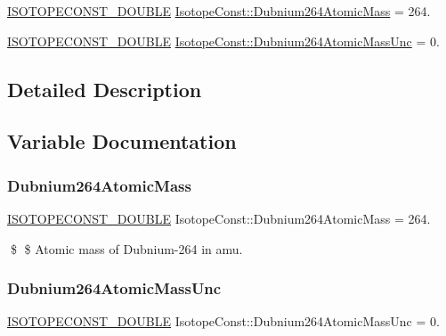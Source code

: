 \begin{DoxyCompactItemize}
\item 
\mbox{\hyperlink{group___isotope_const-_macros_ga8f45a7272ce02c0b4c65c44636ed719a}{I\+S\+O\+T\+O\+P\+E\+C\+O\+N\+S\+T\+\_\+\+D\+O\+U\+B\+LE}} \mbox{\hyperlink{group___isotope_const-_dubnium-_db264_ga01e6ef9266a7f32cda8d37e1257813d2}{Isotope\+Const\+::\+Dubnium264\+Atomic\+Mass}} = 264.
\item 
\mbox{\hyperlink{group___isotope_const-_macros_ga8f45a7272ce02c0b4c65c44636ed719a}{I\+S\+O\+T\+O\+P\+E\+C\+O\+N\+S\+T\+\_\+\+D\+O\+U\+B\+LE}} \mbox{\hyperlink{group___isotope_const-_dubnium-_db264_ga90d5c5fbae6656e55a7c35ac06a42100}{Isotope\+Const\+::\+Dubnium264\+Atomic\+Mass\+Unc}} = 0.
\end{DoxyCompactItemize}


\subsection{Detailed Description}


\subsection{Variable Documentation}
\mbox{\label{group___isotope_const-_dubnium-_db264_ga01e6ef9266a7f32cda8d37e1257813d2}} 
\subsubsection{\texorpdfstring{Dubnium264\+Atomic\+Mass}{Dubnium264AtomicMass}}
{\footnotesize\ttfamily \mbox{\hyperlink{group___isotope_const-_macros_ga8f45a7272ce02c0b4c65c44636ed719a}{I\+S\+O\+T\+O\+P\+E\+C\+O\+N\+S\+T\+\_\+\+D\+O\+U\+B\+LE}} Isotope\+Const\+::\+Dubnium264\+Atomic\+Mass = 264.}

\$ \$ Atomic mass of Dubnium-\/264 in amu. \mbox{\label{group___isotope_const-_dubnium-_db264_ga90d5c5fbae6656e55a7c35ac06a42100}} 
\subsubsection{\texorpdfstring{Dubnium264\+Atomic\+Mass\+Unc}{Dubnium264AtomicMassUnc}}
{\footnotesize\ttfamily \mbox{\hyperlink{group___isotope_const-_macros_ga8f45a7272ce02c0b4c65c44636ed719a}{I\+S\+O\+T\+O\+P\+E\+C\+O\+N\+S\+T\+\_\+\+D\+O\+U\+B\+LE}} Isotope\+Const\+::\+Dubnium264\+Atomic\+Mass\+Unc = 0.}

